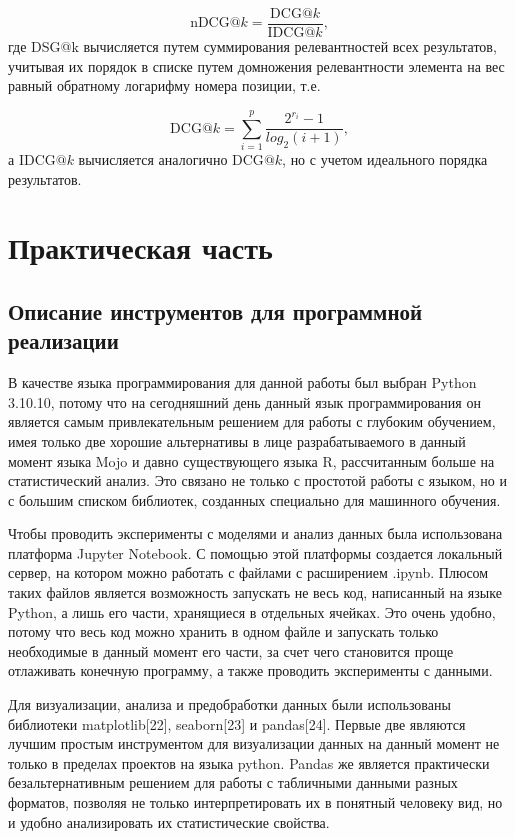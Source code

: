 \documentclass[bachelor, och, coursework]{SCWorks}
\begin{document}
\begin{equation}
    \text{nDCG}@k = \frac{\text{DCG}@k}{\text{IDCG}@k},
\end{equation}
где DSG@k вычисляется путем суммирования релевантностей всех результатов, учитывая их порядок в списке путем домножения релевантности элемента на вес равный обратному логарифму номера позиции, т.е.

\begin{equation}
    \text{DCG}@k = \sum_{i=1}^p\frac{2^{r_i} - 1}{log_2(i+1)},
\end{equation}
а IDCG$@k$ вычисляется аналогично DCG$@k$, но с учетом идеального порядка результатов.
\section{Практическая часть}
\subsection{Описание инструментов для программной реализации}
В качестве языка программирования для данной работы был выбран Python 3.10.10, потому что на сегодняшний день данный язык программирования он является самым привлекательным
решением для работы с глубоким обучением, имея только две хорошие альтернативы в лице разрабатываемого в данный момент языка Mojo и давно существующего языка R, рассчитанным больше на статистический анализ. Это связано не только с простотой работы с языком, но и с большим списком
библиотек, созданных специально для машинного обучения.

Чтобы проводить эксперименты с моделями и анализ данных была использована платформа Jupyter Notebook. С помощью этой платформы создается локальный сервер, на котором можно работать
с файлами с расширением .ipynb. Плюсом таких файлов является возможность запускать не весь код, написанный на языке Python, а лишь его части, хранящиеся в отдельных ячейках.
Это очень удобно, потому что весь код можно хранить в одном файле и запускать только необходимые в данный момент его части, за счет чего становится проще отлаживать конечную программу,
а также проводить эксперименты с данными.

Для визуализации, анализа и предобработки данных были использованы библиотеки matplotlib[22], seaborn[23] и pandas[24]. Первые две являются лучшим простым инструментом для визуализации данных
на данный момент не только в пределах проектов на языка python. Pandas же является практически безальтернативным решением для работы с табличными данными разных форматов, позволяя
не только интерпретировать их в понятный человеку вид, но и удобно анализировать их статистические свойства.
\end{document}
